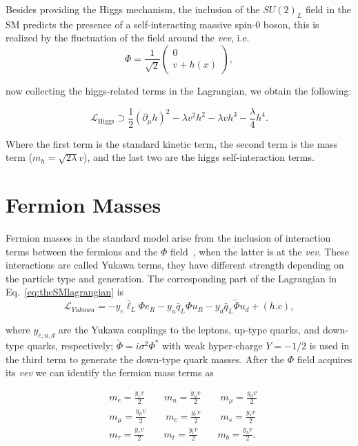 Besides providing the Higgs mechanism, the inclusion of the
$SU(2)_{L}$ field in the SM predicts the presence of a
self-interacting massive spin-0
boson, this is realized by the fluctuation of the field around the
\textit{vev}, i.e.
\begin{equation}
\Phi = \frac{1}{\sqrt{2}}\begin{pmatrix} 0\\
  v + h(x)\end{pmatrix},
\end{equation}
 
now collecting the higgs-related terms in the Lagrangian, we obtain
the following:

\begin{equation}
\mathcal{L}_{\mathrm{Higgs}} \supset
\frac{1}{2}\left(\partial_{\mu}h\right)^{2} -\lambda v^{2}h^{2} -
\lambda vh^{3} - \frac{\lambda}{4}h^{4}.
\end{equation}

Where the first term is the standard kinetic term, the second term is
the mass term ($m_{h} = \sqrt{2\lambda}v$), and the last two are the higgs self-interaction terms. 
\section{Fermion Masses}\label{yukawa}
Fermion masses in the standard model arise from the inclusion of
interaction terms between the fermions and the $\Phi$ field~\cite{WeinbergLeptons}, when
the latter is at the \textit{vev}. These interactions are called
Yukawa terms, they have different strength depending on the particle
type and generation. The corresponding part of the Lagrangian in
Eq.~\ref{eq:theSMlagrangian} is
\begin{equation}
\label{eq:yukawa}
\mathcal{L}_{Yukawa} = -y_{e}\bar{\ell}_{L}\Phi e_{R} - y_{u}\bar{q}_{L}\Phi u_{R}  -
y_{d}\bar{q}_{L}\tilde{\Phi} u_{d} + (h.c),
\end{equation}

where $y_{e,u,d}$ are the Yukawa couplings to the leptons, up-type
quarks, and down-type quarks, respectively; $\tilde{\Phi} =
i\sigma^{2}\Phi^{*}$ with weak hyper-charge $Y = -1/2$ is used in the
third term to generate the down-type quark masses. After the $\Phi$
field acquires its \textit{vev} we can identify the fermion mass terms
as

\begin{equation}
 \begin{aligned}
       &m_{e} = \frac{y_{e}v}{2}  \qquad m_{u} = \frac{y_{u}v}{2}  \qquad  m_{\mu} = \frac{y_{d}v}{2} \\
       &m_{\mu} = \frac{y_{\mu}v}{2}  \qquad m_{c} = \frac{y_{c}v}{2}
       \qquad  m_{s} = \frac{y_{s}v}{2} \\
       &
       m_{\tau} = \frac{y_{\tau}v}{2}  \qquad m_{t} = \frac{y_{t}v}{2}  \qquad  m_{b} = \frac{y_{b}v}{2}.
       \end{aligned}
\label{eq:BosonMasses}
\end{equation}

